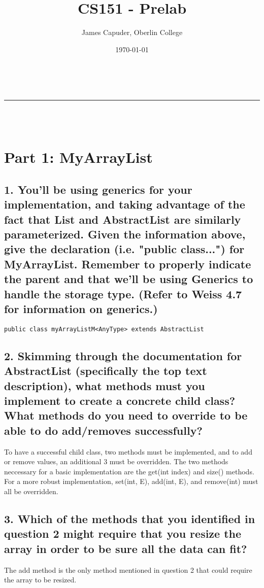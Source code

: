 \documentclass[a4paper,11pt]{article}
\makeatletter
\newcommand{\linia}{\rule{\linewidth}{0.5pt}}
\theoremstyle{mytheor}
\renewcommand{\maketitle}{
\begin{center}
\vspace{2ex}
{\huge \textsc{\@title}}
\vspace{1ex}
\\
\linia\\
\@author \hfill \@date\
\vspace{4ex}
\end{center}
}
\makeatother
\begin{document}
\title{CS151 - Prelab }

\author{James Capuder, Oberlin College}

\date{\today}

\maketitle

\section*{Part 1: MyArrayList}
\subsection*{1. You'll be using generics for your implementation, and taking advantage of the fact that List and AbstractList are similarly parameterized. Given the information above, give the declaration (i.e. "public class...") for MyArrayList. Remember to properly indicate the parent and that we'll be using Generics to handle the storage type. (Refer to Weiss 4.7 for information on generics.)}
\begin{lstlisting}
public class myArrayListM<AnyType> extends AbstractList
\end{lstlisting}

\subsection*{2. Skimming through the documentation for AbstractList (specifically the top text description), what methods must you implement to create a concrete child class? What methods do you need to override to be able to do add/removes successfully?}
To have a successful child class, two methods must be implemented, and to add or remove values, an additional 3 must be overridden. The two methods neccessary for a basic implementation are the get(int index) and size() methods. For a more robust implementation, set(int, E), add(int, E), and remove(int) must all be overridden.

\subsection*{3. Which of the methods that you identified in question 2 might require that you resize the array in order to be sure all the data can fit?}
The add method is the only method mentioned in question 2 that could require the array to be resized.
\end{document}
